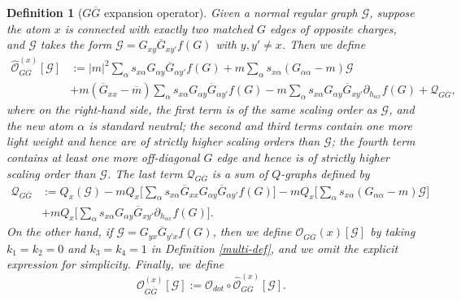 \documentclass{article}
\newcommand{\1}{\mathds{1}}
\numberwithin{equation}{section}
\newcommand{\al}{\alpha}
\renewcommand{\cal}{\mathcal}
\newcommand{\wh}{\widehat}
\theoremstyle{plain} %
\newtheorem{definition}[theorem]{Definition}
\theoremstyle{remark}
\newcommand{\cor}{\color{red}}
\newcommand{\hty}[1]{{\cor (ht: #1) }}
\begin{document}
\begin{definition} [$G\overline G$ expansion operator]\label{GGbar-def} 
Given a normal regular graph $\cal G$, suppose the atom $x$ is connected with exactly two matched $G$ edges of opposite charges,  and $\cal G$ takes the form $\cal G= G_{xy}  \overline G_{xy'} f(G)$ with $y,y' \ne x$.  %
Then we define  
\begin{align}
 \wh{\cal O}_{G\overline G}^{(x)}[\cal G] &:=   |m|^2  \sum_\al s_{x\al }G_{\al y} \overline G_{\al y'} f(G) + m \sum_\al s_{x\al }\left(G_{\al \al} -m \right) \cal G \nonumber  \\
&  +  m (\overline G_{xx} - \overline m)   \sum_\al s_{x\al }G_{\al y} \overline G_{\al y'} f(G)  - m  \sum_\al s_{x\al }G_{\al y}  \overline G_{xy'} \partial_{ h_{\al x}} f(G) + \cal Q_{G\overline G}, \label{Oe3x}
 \end{align}
  where on the right-hand side, the first term is of the same scaling order as $\cal G$, and the new atom $\al$ is standard neutral; the second and third terms  contain one more light weight and hence are of strictly higher scaling orders than $\cal G$; the fourth term  contains at least one more off-diagonal $G$ edge and hence is of strictly higher scaling order than $\cal G$. The last term $\cal Q_{G\overline G} $ is a sum of $Q$-graphs defined by
 \begin{align*}
 \cal Q_{G\overline G}&:= Q_x \left(\cal G\right) -  m Q_x\Big[ \sum_\al s_{x\al }\overline G_{xx}G_{\al y} \overline G_{\al y'} f(G) \Big] - m Q_x\Big[\sum_\al s_{x\al }\left(G_{\al \al} -m \right) \cal G\Big] \\
 & + mQ_x\Big[  \sum_\al s_{x\al }G_{\al y}  \overline G_{xy'} \partial_{ h_{\al x}} f(G) \Big].
\end{align*}
On the other hand, if $\cal G= G_{yx}  \overline G_{y'x} f(G)$, then we define $\cal O_{G\overline G}(x)[ \cal G] $ by taking $k_1=k_2=0$ and $k_3=k_4=1$ in Definition \ref{multi-def}, and we omit the explicit expression for simplicity.  Finally, we define
$${\cal O}_{G\overline G}^{(x)}[ \cal G]:= \cal O_{dot} \circ  \wh{\cal O}_{G\overline G}^{(x)}   [\cal G]. $$  

\end{definition}
\end{document}
